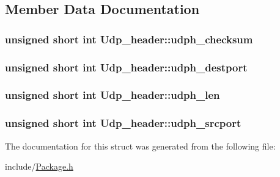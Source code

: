 \subsection{Member Data Documentation}
\hypertarget{structUdp__header_a7df7310126d017145fccb980dccd8752}{
\subsubsection[{udph\-\_\-checksum}]{\setlength{\rightskip}{0pt plus 5cm}unsigned short int Udp\-\_\-header\-::udph\-\_\-checksum}}\label{structUdp__header_a7df7310126d017145fccb980dccd8752}
\hypertarget{structUdp__header_a4468a6ca345200bb93d91ceb4e1a7843}{
\subsubsection[{udph\-\_\-destport}]{\setlength{\rightskip}{0pt plus 5cm}unsigned short int Udp\-\_\-header\-::udph\-\_\-destport}}\label{structUdp__header_a4468a6ca345200bb93d91ceb4e1a7843}
\hypertarget{structUdp__header_aeff8dcbd93248830320fb64d5d056ae1}{
\subsubsection[{udph\-\_\-len}]{\setlength{\rightskip}{0pt plus 5cm}unsigned short int Udp\-\_\-header\-::udph\-\_\-len}}\label{structUdp__header_aeff8dcbd93248830320fb64d5d056ae1}
\hypertarget{structUdp__header_aa00a58023dd2a55db5b6e10d1a20a2a6}{
\subsubsection[{udph\-\_\-srcport}]{\setlength{\rightskip}{0pt plus 5cm}unsigned short int Udp\-\_\-header\-::udph\-\_\-srcport}}\label{structUdp__header_aa00a58023dd2a55db5b6e10d1a20a2a6}


The documentation for this struct was generated from the following file\-:\begin{DoxyCompactItemize}
\item 
include/\hyperlink{Package_8h}{Package.\-h}\end{DoxyCompactItemize}
